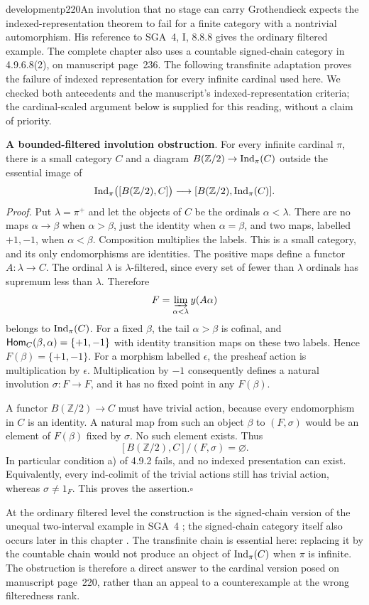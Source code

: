 \begin{dcomment}{development}{p220}{An involution that no stage can carry}
Grothendieck expects the indexed-representation theorem to fail for a finite category with a nontrivial automorphism. His reference to SGA~4, I, 8.8.8 gives the ordinary filtered example. The complete chapter also uses a countable signed-chain category in 4.9.6.8(2), on manuscript page~236. The following transfinite adaptation proves the failure of indexed representation for every infinite cardinal used here. We checked both antecedents and the manuscript's indexed-representation criteria; the cardinal-scaled argument below is supplied for this reading, without a claim of priority.

\textbf{A bounded-filtered involution obstruction}\ours.
For every infinite cardinal $\pi$, there is a small category $C$ and a diagram $B(\mathbb Z/2)\to\operatorname{Ind}_\pi(C)$ outside the essential image of
\[
 \operatorname{Ind}_\pi\bigl([B(\mathbb Z/2),C]\bigr)
 \longrightarrow[B(\mathbb Z/2),\operatorname{Ind}_\pi(C)].
\]
\textit{Proof.} Put $\lambda=\pi^+$ and let the objects of $C$ be the ordinals $\alpha<\lambda$. There are no maps $\alpha\to\beta$ when $\alpha>\beta$, just the identity when $\alpha=\beta$, and two maps, labelled $+1,-1$, when $\alpha<\beta$. Composition multiplies the labels. This is a small category, and its only endomorphisms are identities. The positive maps define a functor $A:\lambda\to C$. The ordinal $\lambda$ is $\lambda$-filtered, since every set of fewer than $\lambda$ ordinals has supremum less than $\lambda$. Therefore
\[
 F=\varinjlim_{\alpha<\lambda}y(A\alpha)
\]
belongs to $\operatorname{Ind}_\pi(C)$. For a fixed $\beta$, the tail $\alpha>\beta$ is cofinal, and $\mathsf{Hom}_C(\beta,\alpha)=\{+1,-1\}$ with identity transition maps on these two labels. Hence $F(\beta)=\{+1,-1\}$. For a morphism labelled $\epsilon$, the presheaf action is multiplication by $\epsilon$. Multiplication by $-1$ consequently defines a natural involution $\sigma:F\to F$, and it has no fixed point in any $F(\beta)$.

A functor $B(\mathbb Z/2)\to C$ must have trivial action, because every endomorphism in $C$ is an identity. A natural map from such an object $\beta$ to $(F,\sigma)$ would be an element of $F(\beta)$ fixed by $\sigma$. No such element exists. Thus
\[
 [B(\mathbb Z/2),C]/(F,\sigma)=\varnothing.
\]
In particular condition a) of 4.9.2 fails, and no indexed presentation can exist. Equivalently, every ind-colimit of the trivial actions still has trivial action, whereas $\sigma\neq1_F$. This proves the assertion.\hfill$\square$

At the ordinary filtered level the construction is the signed-chain version of the unequal two-interval example in SGA~4 \citep[I, Exercise~8.8.8]{SGA4I1972}; the signed-chain category itself also occurs later in this chapter \citep[4.9.6.8(2)]{Grothendieck1990XVIII}. The transfinite chain is essential here: replacing it by the countable chain would not produce an object of $\operatorname{Ind}_\pi(C)$ when $\pi$ is infinite. The obstruction is therefore a direct answer to the cardinal version posed on manuscript page~220, rather than an appeal to a counterexample at the wrong filteredness rank.
\end{dcomment}


